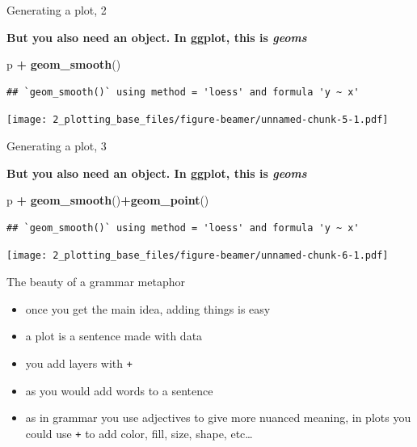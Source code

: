 \documentclass[
  ignorenonframetext,
]{beamer}
\newenvironment{Shaded}{\begin{snugshade}}{\end{snugshade}}
\newcommand{\KeywordTok}[1]{\textcolor[rgb]{0.13,0.29,0.53}{\textbf{#1}}}
\newcommand{\NormalTok}[1]{#1}
\newcommand{\OperatorTok}[1]{\textcolor[rgb]{0.81,0.36,0.00}{\textbf{#1}}}
\newcommand{\StringTok}[1]{\textcolor[rgb]{0.31,0.60,0.02}{#1}}
\providecommand{\tightlist}{%
  \setlength{\itemsep}{0pt}\setlength{\parskip}{0pt}}
\begin{document}
\begin{frame}[fragile]{Generating a plot, 2}
\protect\hypertarget{generating-a-plot-2}{}

\textbf{But you also need an object. In ggplot, this is \emph{geoms} }

\begin{Shaded}
\begin{Highlighting}[]
\NormalTok{p }\OperatorTok{+}\StringTok{ }\KeywordTok{geom_smooth}\NormalTok{()}
\end{Highlighting}
\end{Shaded}

\begin{verbatim}
## `geom_smooth()` using method = 'loess' and formula 'y ~ x'
\end{verbatim}

\texttt{[image: 2\_plotting\_base\_files/figure-beamer/unnamed-chunk-5-1.pdf]}

\end{frame}

\begin{frame}[fragile]{Generating a plot, 3}
\protect\hypertarget{generating-a-plot-3}{}

\textbf{But you also need an object. In ggplot, this is \emph{geoms} }

\begin{Shaded}
\begin{Highlighting}[]
\NormalTok{p }\OperatorTok{+}\StringTok{ }\KeywordTok{geom_smooth}\NormalTok{()}\OperatorTok{+}\KeywordTok{geom_point}\NormalTok{()}
\end{Highlighting}
\end{Shaded}

\begin{verbatim}
## `geom_smooth()` using method = 'loess' and formula 'y ~ x'
\end{verbatim}

\texttt{[image: 2\_plotting\_base\_files/figure-beamer/unnamed-chunk-6-1.pdf]}

\end{frame}

\begin{frame}[fragile]{The beauty of a grammar metaphor}
\protect\hypertarget{the-beauty-of-a-grammar-metaphor}{}

\begin{itemize}
\tightlist
\item
  once you get the main idea, adding things is easy
\item
  a plot is a sentence made with data
\item
  you add layers with \texttt{+}
\item
  as you would add words to a sentence
\item
  as in grammar you use adjectives to give more nuanced meaning, in
  plots you could use \texttt{+} to add color, fill, size, shape,
  etc\ldots{}
\end{itemize}

\end{frame}
\end{document}
